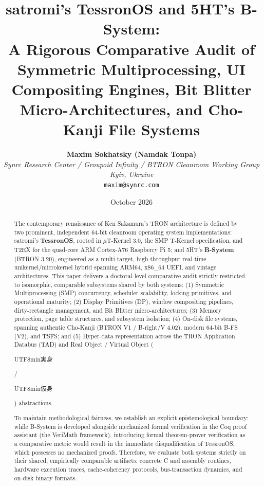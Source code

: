 \documentclass[10pt,journal,compsoc,twocolumn]{article}
\title{\LARGE \textbf{satromi's TessronOS and 5HT's B-System:\\A Rigorous Comparative Audit of Symmetric Multiprocessing, UI Compositing Engines, Bit Blitter Micro-Architectures, and Cho-Kanji File Systems}}
\author{
    \textbf{Maxim Sokhatsky (Namdak Tonpa)}\\[0.3em]
    \small \textit{Synrc Research Center / Groupoid Infinity / BTRON Cleanroom Working Group}\\
    \small \textit{Kyiv, Ukraine}\\
    \small \texttt{maxim@synrc.com}
}
\date{October 2026}
\newcommand{\ja}[1]{\begin{CJK*}{UTF8}{min}#1\end{CJK*}}
\begin{document}
\maketitle

\begin{abstract}
The contemporary renaissance of Ken Sakamura's TRON architecture is defined by two prominent, independent 64-bit cleanroom operating system implementations: satromi's \textbf{TessronOS}, rooted in $\mu$T-Kernel 3.0, the SMP T-Kernel specification, and T2EX for the quad-core ARM Cortex-A76 Raspberry Pi 5; and 5HT's \textbf{B-System} (BTRON 3.20), engineered as a multi-target, high-throughput real-time unikernel/microkernel hybrid spanning ARM64, x86\_64 UEFI, and vintage architectures. This paper delivers a doctoral-level comparative audit strictly restricted to isomorphic, comparable subsystems shared by both systems: (1) Symmetric Multiprocessing (SMP) concurrency, scheduler scalability, locking primitives, and operational maturity; (2) Display Primitives (DP), window compositing pipelines, dirty-rectangle management, and Bit Blitter micro-architectures; (3) Memory protection, page table structures, and subsystem isolation; (4) On-disk file systems, spanning authentic Cho-Kanji (BTRON V1 / B-right/V 4.02), modern 64-bit B-FS (V2), and TSFS; and (5) Hyper-data representation across the TRON Application Databus (TAD) and Real Object / Virtual Object (\ja{実身}/\ja{仮身}) abstractions.

To maintain methodological fairness, we establish an explicit epistemological boundary: while B-System is developed alongside mechanized formal verification in the Coq proof assistant (the VeriMath framework), introducing formal theorem-prover verification as a comparative metric would result in the immediate disqualification of TessronOS, which possesses no mechanized proofs. Therefore, we evaluate both systems strictly on their shared, empirically comparable artifacts: concrete C and assembly routines, hardware execution traces, cache-coherency protocols, bus-transaction dynamics, and on-disk binary formats.


\end{abstract}
\end{document}

